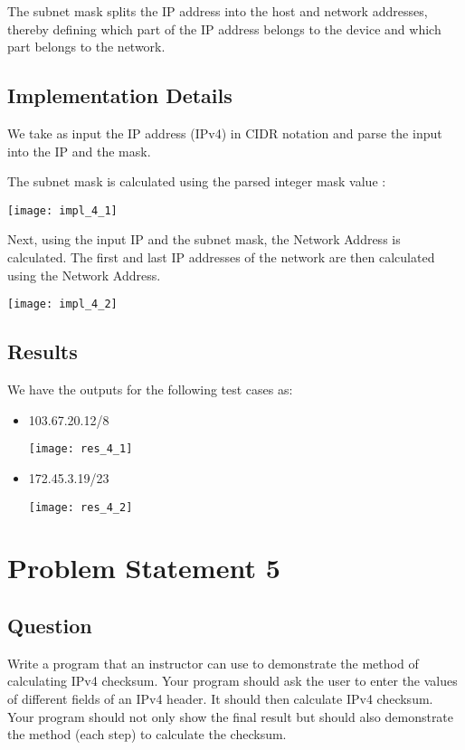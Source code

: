 \documentclass[11pt,a4paper]{article}
\begin{document}
The subnet mask splits the IP address into the host and network addresses, thereby defining which part of the IP address belongs to the device and which part belongs to the network.

\subsection{Implementation Details}\label{sec:details4}
We take as input the IP address (IPv4) in CIDR notation and parse the input into the IP and the mask.

The subnet mask is calculated using the parsed integer mask value :

\texttt{[image: impl\_4\_1]}

Next, using the input IP and the subnet mask, the Network Address is calculated. The first and last IP addresses of the network are then calculated using the Network Address.

\texttt{[image: impl\_4\_2]}

\subsection{Results}\label{sec:results4}
We have the outputs for the following test cases as:
\begin{itemize}
    \item 103.67.20.12/8
    
    \texttt{[image: res\_4\_1]}
    
    \item 172.45.3.19/23
    
    \texttt{[image: res\_4\_2]}
    
\end{itemize}

\section{Problem Statement 5}\label{sec:problem5}
\subsection{Question}\label{sec:question5}
Write a program that an instructor can use to demonstrate the method of calculating IPv4 checksum. Your program should ask the user to enter the values of different fields of an IPv4 header. It should then calculate IPv4 checksum. Your program should not only show the final result but should also demonstrate the method (each step) to calculate the checksum.
\end{document}
